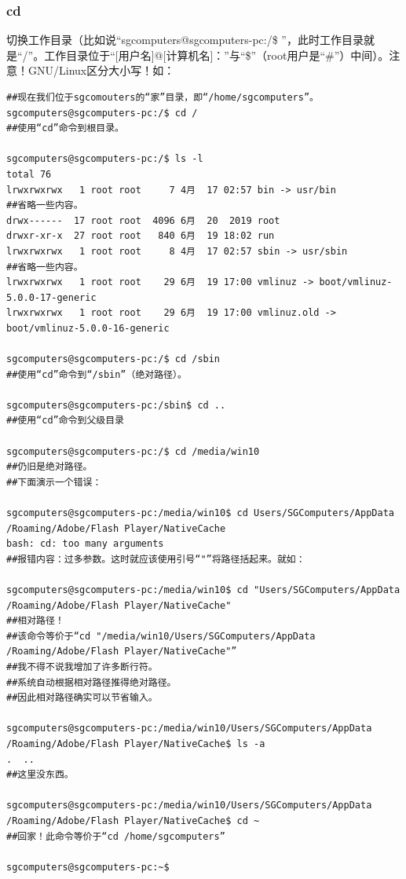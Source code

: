 \subsubsection{cd}
\label{sec:cd}切换工作目录（比如说“sgcomputers@sgcomputers-pc:/\$ ”，此时工作目录就是“/”。工作目录位于“[用户名]@[计算机名]：”与“\$”（root用户是“\#”）中间）。{\color{red}注意！GNU/Linux区分大小写！}如：
\begin{verbatim}
##现在我们位于sgcomouters的“家”目录，即“/home/sgcomputers”。
sgcomputers@sgcomputers-pc:/$ cd /
##使用“cd”命令到根目录。

sgcomputers@sgcomputers-pc:/$ ls -l
total 76
lrwxrwxrwx   1 root root     7 4月  17 02:57 bin -> usr/bin
##省略一些内容。
drwx------  17 root root  4096 6月  20  2019 root
drwxr-xr-x  27 root root   840 6月  19 18:02 run
lrwxrwxrwx   1 root root     8 4月  17 02:57 sbin -> usr/sbin
##省略一些内容。
lrwxrwxrwx   1 root root    29 6月  19 17:00 vmlinuz -> boot/vmlinuz-5.0.0-17-generic
lrwxrwxrwx   1 root root    29 6月  19 17:00 vmlinuz.old -> boot/vmlinuz-5.0.0-16-generic

sgcomputers@sgcomputers-pc:/$ cd /sbin
##使用“cd”命令到“/sbin”（绝对路径）。

sgcomputers@sgcomputers-pc:/sbin$ cd ..
##使用“cd”命令到父级目录

sgcomputers@sgcomputers-pc:/$ cd /media/win10
##仍旧是绝对路径。
##下面演示一个错误：

sgcomputers@sgcomputers-pc:/media/win10$ cd Users/SGComputers/AppData
/Roaming/Adobe/Flash Player/NativeCache
bash: cd: too many arguments
##报错内容：过多参数。这时就应该使用引号“"”将路径括起来。就如：

sgcomputers@sgcomputers-pc:/media/win10$ cd "Users/SGComputers/AppData
/Roaming/Adobe/Flash Player/NativeCache"
##相对路径！
##该命令等价于“cd "/media/win10/Users/SGComputers/AppData
/Roaming/Adobe/Flash Player/NativeCache"”
##我不得不说我增加了许多断行符。
##系统自动根据相对路径推得绝对路径。
##因此相对路径确实可以节省输入。

sgcomputers@sgcomputers-pc:/media/win10/Users/SGComputers/AppData
/Roaming/Adobe/Flash Player/NativeCache$ ls -a
.  ..
##这里没东西。

sgcomputers@sgcomputers-pc:/media/win10/Users/SGComputers/AppData
/Roaming/Adobe/Flash Player/NativeCache$ cd ~
##回家！此命令等价于“cd /home/sgcomputers”

sgcomputers@sgcomputers-pc:~$ 
\end{verbatim}
